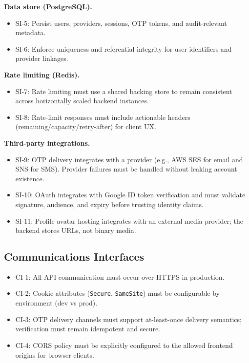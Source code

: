 \documentclass[11pt]{article}
\begin{document}
    \textbf{Data store (PostgreSQL).}
    \begin{itemize}
        \item SI-5: Persist users, providers, sessions, OTP tokens, and audit-relevant metadata.
        \item SI-6: Enforce uniqueness and referential integrity for user identifiers and provider linkages.
    \end{itemize}

    \textbf{Rate limiting (Redis).}
    \begin{itemize}
        \item SI-7: Rate limiting must use a shared backing store to remain consistent across horizontally scaled backend instances.
        \item SI-8: Rate-limit responses must include actionable headers (remaining/capacity/retry-after) for client UX.
    \end{itemize}

    \textbf{Third-party integrations.}
    \begin{itemize}
        \item SI-9: OTP delivery integrates with a provider (e.g., AWS SES for email and SNS for SMS). Provider failures must be handled without leaking account existence.
        \item SI-10: OAuth integrates with Google ID token verification and must validate signature, audience, and expiry before trusting identity claims.
        \item SI-11: Profile avatar hosting integrates with an external media provider; the backend stores URLs, not binary media.
    \end{itemize}

    \subsection{Communications Interfaces}
    \begin{itemize}
        \item CI-1: All API communication must occur over HTTPS in production.
        \item CI-2: Cookie attributes (\texttt{Secure}, \texttt{SameSite}) must be configurable by environment (dev vs prod).
        \item CI-3: OTP delivery channels must support at-least-once delivery semantics; verification must remain idempotent and secure.
        \item CI-4: CORS policy must be explicitly configured to the allowed frontend origins for browser clients.
    \end{itemize}
\end{document}
